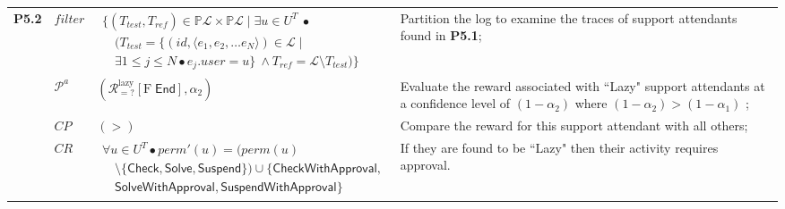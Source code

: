 \begin{landscape}
\begin{longtable}{R{0.7cm}R{0.7cm}R{7.8cm}R{12.3cm}}
	 \textbf{P5.2} & $\mathit{filter}$ & $\begin{array}{l}
	\bigl\{(T_\mathit{test},T_\mathit{ref})\in \mathbb{P}\mathcal{L}\!\times\! \mathbb{P}\mathcal{L} \mid
	\exists u\!\in\! U^T\: \bullet\\
	\quad  \bigl(T_\mathit{test} = \{ (\mathit{id},\langle e_1, e_2, \ldots e_N \rangle)\!\in\! \mathcal{L} \mid\\
	\quad \exists 1\leq j\leq N \bullet e_j.\mathit{user}=u\} \: \wedge  T_\mathit{ref} = \mathcal{L}\setminus T_\mathit{test}\bigr)\bigr\}
	\end{array}$ & Partition the log to examine the traces of support attendants found in \textbf{P5.1};\\
	& $\mathcal{P}^a$ & $(\mathcal{R}_{=?}^\mathrm{lazy} [\mathrm{F}\; \mathsf{End}], \alpha_2)$ &  Evaluate the reward associated with ``Lazy" support attendants at a confidence level of $(1 - \alpha_2)$ where $(1-\alpha_2) > (1 - \alpha_1)$ ;\\
	 & $\mathit{CP}$ & $(>)$ & Compare the reward for this support attendant with all others;\\
	& $\mathit{CR}$ & $\begin{array}{l}
	\forall u \in U^{T} \bullet \mathit{perm}'(u)\!=\! (\mathit{perm}(u) \\ 
	\quad \setminus \{\mathsf{Check}, \mathsf{Solve}, \mathsf{Suspend}\}) \cup 
	 \{\mathsf{CheckWithApproval}, \\
	 \quad \mathsf{SolveWithApproval}, \mathsf{SuspendWithApproval}\} 
	 \end{array}$& If they are found to be ``Lazy" then their activity requires approval.\\ \hline		
	

\end{longtable}
\end{landscape}
